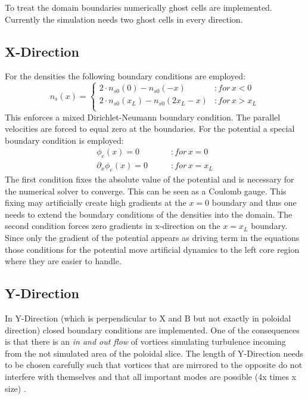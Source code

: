 \documentclass[master.tex]{subfiles}
\begin{document}
To treat the domain boundaries numerically ghost cells are implemented. Currently the simulation needs two ghost cells in every direction.

\subsection{X-Direction}
For the densities the following boundary conditions are employed:
\begin{equation}
    n_s(x) = \begin{cases}
        2 \cdot n_{s0}(0) - n_{s0}(-x) &\colon for \, x < 0 \\
        2 \cdot n_{s0}(x_L) - n_{s0}(2x_L-x) &\colon for \, x > x_L \\
    \end{cases}
\end{equation}
This enforces a mixed Dirichlet-Neumann boundary condition.
The parallel velocities are forced to equal zero at the boundaries.
For the potential a special boundary condition is employed:
\begin{align}
    \phi_e(x) = 0 \qquad &\colon for \, x = 0\\
    \partial_x\phi_e(x) = 0 \qquad &\colon for \, x = x_L \label{eq:boundary-potential-right}
\end{align}
The first condition fixes the absolute value of the potential and is necessary for the numerical solver to converge. This can be seen as a Coulomb gauge. This fixing may artificially create high gradients at the $x=0$ boundary and thus one needs to extend the boundary conditions of the densities into the domain. The second condition forces zero gradients in x-direction on the $x=x_L$ boundary. Since only the gradient of the potential appears as driving term in the equations those conditions for the potential move artificial dynamics to the left core region where they are easier to handle. 

\subsection{Y-Direction}
In Y-Direction (which is perpendicular to X and $\mathrm{B}$ but not exactly in poloidal direction) closed boundary conditions are implemented. One of the consequences is that there is an \textit{in and out flow} of vortices simulating turbulence incoming from the not simulated area of the poloidal slice. The length of Y-Direction needs to be chosen carefully such that vortices that are mirrored to the opposite do not interfere with themselves and that all important modes are possible (4x times x size) \cite{ScottFluxTube} \cite{ScottComputationMagneticallyConfinedPlasmas}.
\end{document}
